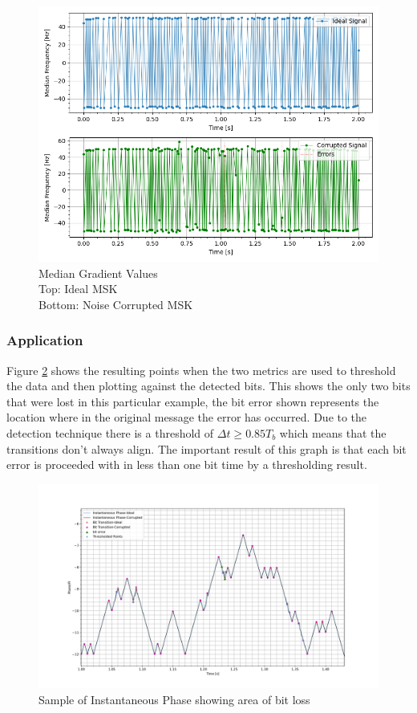 \begin{figure}[h!]
    \centering
    \includegraphics[width = \textwidth]{figs/error/medianGrad.png}
    \caption{\centering Median Gradient Values \\ Top: Ideal MSK \\ Bottom: Noise Corrupted MSK}
    \label{fig:medgrad}
\end{figure}


\pagebreak
\subsubsection{Application}

Figure \ref{fig:thresholding} shows the resulting points when the two metrics are used to threshold the data and then plotting against the detected bits. This shows the only two bits that were lost in this particular example, the bit error shown represents the location where in the original message the error has occurred. Due to the detection technique there is a threshold of $\Delta t \geq 0.85T_b$ which means that the transitions don't always align. The important result of this graph is that each bit error is proceeded with in less than one bit time by a thresholding result.

\begin{figure}[h!]
    \centering
    \includegraphics[width = \textwidth]{figs/error/Thresholding.png}
    \caption{Sample of Instantaneous Phase showing area of bit loss}
    \label{fig:thresholding}
\end{figure}

